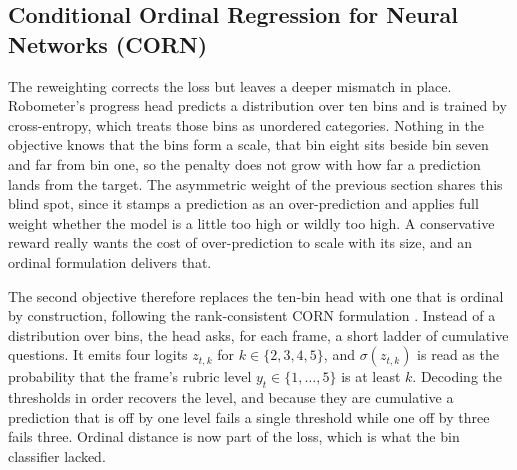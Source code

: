 \subsection{Conditional Ordinal Regression for Neural Networks (CORN)}

The reweighting corrects the loss but leaves a deeper mismatch in place. Robometer's progress head predicts a distribution over ten bins and is trained by cross-entropy, which treats those bins as unordered categories. Nothing in the objective knows that the bins form a scale, that bin eight sits beside bin seven and far from bin one, so the penalty does not grow with how far a prediction lands from the target. The asymmetric weight of the previous section shares this blind spot, since it stamps a prediction as an over-prediction and applies full weight whether the model is a little too high or wildly too high. A conservative reward really wants the cost of over-prediction to scale with its size, and an ordinal formulation delivers that.

The second objective therefore replaces the ten-bin head with one that is ordinal by construction, following the rank-consistent CORN formulation \citep{shi_deep_2021}.
Instead of a distribution over bins, the head asks, for each frame, a short ladder of cumulative questions. It emits four logits $z_{t,k}$ for $k \in \{2,3,4,5\}$, and $\sigma(z_{t,k})$ is read as the probability that the frame's rubric level $y_t \in \{1,\dots,5\}$ is at least $k$. Decoding the thresholds in order recovers the level, and because they are cumulative a prediction that is off by one level fails a single threshold while one off by three fails three. Ordinal distance is now part of the loss, which is what the bin classifier lacked.

